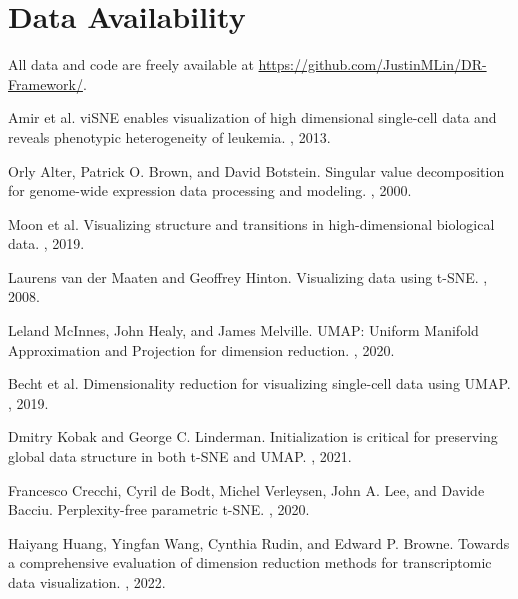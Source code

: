 \documentclass{article}
\begin{document}
\section{Data Availability}
All data and code are freely available at \url{https://github.com/JustinMLin/DR-Framework/}.




\begin{thebibliography}{10}

Amir et al.
\newblock viSNE enables visualization of high dimensional single-cell data and reveals phenotypic heterogeneity of leukemia.
, 2013.

Orly Alter, Patrick O. Brown, and David Botstein.
\newblock Singular value decomposition for genome-wide expression data processing and modeling.
, 2000.

Moon et al.
\newblock Visualizing structure and transitions in high-dimensional biological data.
, 2019.

Laurens van der Maaten and Geoffrey Hinton.
\newblock Visualizing data using t-SNE.
, 2008.

Leland McInnes, John Healy, and James Melville.
\newblock UMAP: Uniform Manifold Approximation and Projection for dimension reduction.
, 2020.

Becht et al.
\newblock Dimensionality reduction for visualizing single-cell data using UMAP.
, 2019.

Dmitry Kobak and George C. Linderman.
\newblock Initialization is critical for preserving global data structure in both t-SNE and UMAP.
, 2021.

Francesco Crecchi, Cyril de Bodt, Michel Verleysen, John A. Lee, and Davide Bacciu.
\newblock Perplexity-free parametric t-SNE.
, 2020.

Haiyang Huang, Yingfan Wang, Cynthia Rudin, and Edward P. Browne.
\newblock Towards a comprehensive evaluation of dimension reduction methods for transcriptomic data visualization.
, 2022.


\end{thebibliography}
\end{document}
